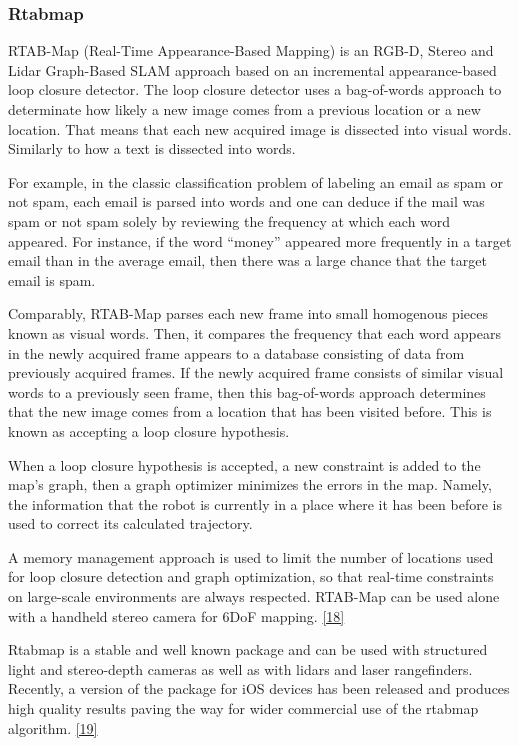 \documentclass{article}
\begin{document}
\subsubsection{Rtabmap}

RTAB-Map (Real-Time Appearance-Based Mapping) is an RGB-D, Stereo and Lidar Graph-Based SLAM approach based on an incremental appearance-based loop closure detector. The loop closure detector uses a bag-of-words approach to determinate how likely a new image comes from a previous location or a new location. That means that each new acquired image is dissected into visual words. Similarly to how a text is dissected into words. 

For example, in the classic classification problem of labeling an email as spam or not spam, each email is parsed into words and one can deduce if the mail was spam or not spam solely by reviewing the frequency at which each word appeared. For instance, if the word “money” appeared more frequently in a target email than in the average email, then there was a large chance that the target email is spam.

Comparably, RTAB-Map parses each new frame into small homogenous pieces known as visual words. Then, it compares the frequency that each word appears in the newly acquired frame appears to a database consisting of data from previously acquired frames. If the newly acquired frame consists of similar visual words to a previously seen frame, then this bag-of-words approach determines that the new image comes from a location that has been visited before. This is known as accepting a loop closure hypothesis.

When a loop closure hypothesis is accepted, a new constraint is added to the map’s graph, then a graph optimizer minimizes the errors in the map. Namely, the information that the robot is currently in a place where it has been before is used to correct its calculated trajectory. 

A memory management approach is used to limit the number of locations used for loop closure detection and graph optimization, so that real-time constraints on large-scale environments are always respected. RTAB-Map can be used alone with a handheld stereo camera for 6DoF mapping. \href{http://introlab.github.io/rtabmap/}{[18]}

Rtabmap is a stable and well known package and can be used with structured light and stereo-depth cameras as well as with lidars and laser rangefinders. Recently, a version of the package for iOS devices has been released and produces high quality results paving the way for wider commercial use of the rtabmap algorithm. \href{https://www.youtube.com/watch?v=rVpIcrgD5c0}{[19]}
\end{document}
